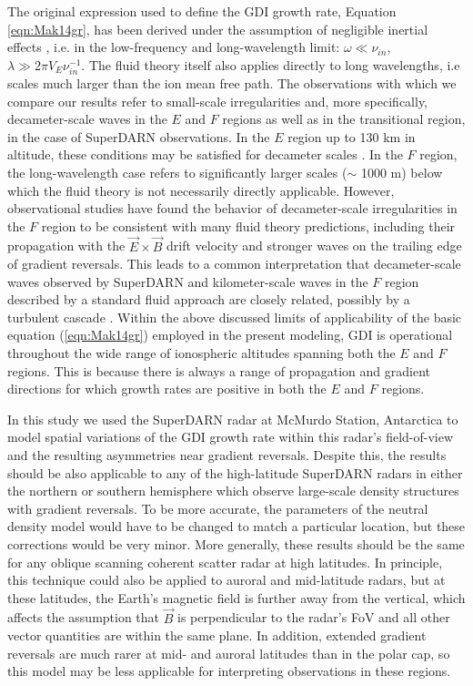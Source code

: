 The original expression used to define the GDI growth rate, Equation \ref{eqn:Mak14gr}, has been derived under the assumption of negligible inertial effects \citep{Makarevich2014c}, i.e. in the low-frequency and long-wavelength limit: \(\omega\ll \nu_{in}\), \(\lambda\gg 2\pi V_E \nu_{in}^{-1}\). The fluid theory itself also applies directly to long wavelengths, i.e scales much larger than the ion mean free path. The observations with which we compare our results refer to small-scale irregularities and, more specifically, decameter-scale waves in the \(E\) and \(F\) regions as well as in the transitional region, in the case of SuperDARN observations. In the \(E\) region up to 130 km in altitude, these conditions may be satisfied for decameter scales \citep[e.g.][]{Fejer1984}. In the \(F\) region, the long-wavelength case refers to significantly larger scales (\(\sim\) 1000 m) below which the fluid theory is not necessarily directly applicable. However, observational studies have found the behavior of decameter-scale irregularities in the \(F\) region to be consistent with many fluid theory predictions, including their propagation with the \(\vec{E}\times\vec{B}\) drift velocity and stronger waves on the trailing edge of gradient reversals. This leads to a common interpretation that decameter-scale waves observed by SuperDARN and  kilometer-scale waves in the \(F\) region described by a standard fluid approach are closely related, possibly by a turbulent cascade \citep[e.g.][]{Tsunoda1988}.  Within the above discussed limits of applicability of the basic equation (\ref{eqn:Mak14gr}) employed in the present modeling, GDI is operational throughout the wide range of ionospheric altitudes spanning both the \(E\) and \(F\) regions. This is because there is always a range of propagation and gradient directions for which growth rates are positive in both the \(E\) and \(F\) regions.




In this study we used the SuperDARN radar at McMurdo Station, Antarctica to model spatial variations of the GDI growth rate within this radar's field-of-view and the resulting asymmetries near gradient reversals. Despite this, the results should be also applicable to any of the high-latitude SuperDARN radars in either the northern or southern hemisphere which observe large-scale density structures with gradient reversals. To be more accurate, the parameters of the neutral density model would have to be changed to match a particular location, but these corrections would be very minor. More generally, these results should be the same for any oblique scanning coherent scatter radar at high latitudes.  In principle, this technique could also be applied to auroral and mid-latitude radars, but at these latitudes, the Earth's magnetic field is further away from the vertical, which affects the assumption that \(\vec{B}\) is perpendicular to the radar's FoV and all other vector quantities are within the same plane. In addition, extended gradient reversals are much rarer at mid- and auroral latitudes than in the polar cap, so this model may be less applicable for interpreting observations in these regions. 


